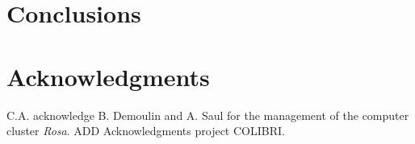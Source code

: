 \documentclass[submission, Phys]{SciPost}
\renewcommand{\[}{\left[}
\renewcommand{\]}{\right]}
\renewcommand{\(}{\left(}
\renewcommand{\)}{\right)}
\begin{document}
\section{Conclusions}
\section*{Acknowledgments}
C.A. acknowledge B. Demoulin and  A. Saul for the management of the computer cluster \emph{Rosa}. ADD Acknowledgments project COLIBRI. 
%

\nolinenumbers
\end{document}
